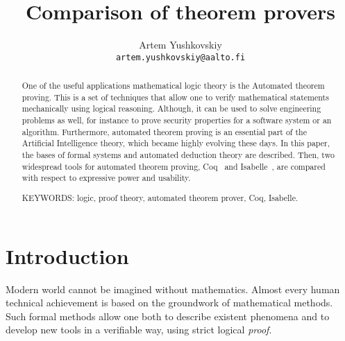 \documentclass[article]{aaltoseries}
\begin{document}

\title{Comparison of theorem provers}

\author{Artem Yushkovskiy
\\\textnormal{\texttt{artem.yushkovskiy@aalto.fi}}}


\maketitle


\begin{abstract}
One of the useful applications mathematical logic theory is the Automated theorem proving. This is a set of techniques that allow one to verify mathematical statements mechanically using logical reasoning. Although, it can be used to solve engineering problems as well, for instance to prove security properties for a software system or an algorithm. Furthermore, automated theorem proving is an essential part of the Artificial Intelligence theory, which became highly evolving these days. In this paper, the bases of formal systems and automated deduction theory are described. Then, two widespread tools for automated theorem proving, Coq~\cite{tool_Coq} and Isabelle~\cite{tool_Isabelle}, are compared with respect to expressive power and usability.

\vspace{3mm}
\noindent KEYWORDS: logic, proof theory, automated theorem prover, Coq, Isabelle.
	
\end{abstract}




\section{Introduction}

Modern world cannot be imagined without mathematics. Almost every human technical achievement is based on the groundwork of mathematical methods. Such formal methods allow one both to describe existent phenomena and to develop new tools in a verifiable way, using strict logical \textit{proof}.

\end{document}
